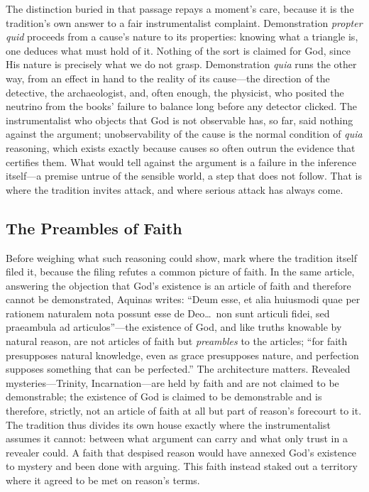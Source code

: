 The distinction buried in that passage repays a moment's care, because it is the tradition's own answer to a fair instrumentalist complaint. Demonstration \emph{propter quid} proceeds from a cause's nature to its properties: knowing what a triangle is, one deduces what must hold of it. Nothing of the sort is claimed for God, since His nature is precisely what we do not grasp. Demonstration \emph{quia} runs the other way, from an effect in hand to the reality of its cause---the direction of the detective, the archaeologist, and, often enough, the physicist, who posited the neutrino from the books' failure to balance long before any detector clicked. The instrumentalist who objects that God is not observable has, so far, said nothing against the argument; unobservability of the cause is the normal condition of \emph{quia} reasoning, which exists exactly because causes so often outrun the evidence that certifies them. What would tell against the argument is a failure in the inference itself---a premise untrue of the sensible world, a step that does not follow. That is where the tradition invites attack, and where serious attack has always come.

\subsection{The Preambles of Faith}

Before weighing what such reasoning could show, mark where the tradition itself filed it, because the filing refutes a common picture of faith. In the same article, answering the objection that God's existence is an article of faith and therefore cannot be demonstrated, Aquinas writes: ``Deum esse, et alia huiusmodi quae per rationem naturalem nota possunt esse de Deo\ldots\ non sunt articuli fidei, sed praeambula ad articulos''---the existence of God, and like truths knowable by natural reason, are not articles of faith but \emph{preambles} to the articles; ``for faith presupposes natural knowledge, even as grace presupposes nature, and perfection supposes something that can be perfected.'' The architecture matters. Revealed mysteries---Trinity, Incarnation---are held by faith and are not claimed to be demonstrable; the existence of God is claimed to be demonstrable and is therefore, strictly, not an article of faith at all but part of reason's forecourt to it. The tradition thus divides its own house exactly where the instrumentalist assumes it cannot: between what argument can carry and what only trust in a revealer could. A faith that despised reason would have annexed God's existence to mystery and been done with arguing. This faith instead staked out a territory where it agreed to be met on reason's terms.

